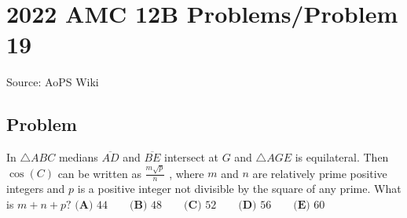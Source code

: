 \documentclass[12pt]{article}
\begin{document}
\section*{{2022 AMC 12B Problems/Problem 19}}
Source: AoPS Wiki

\subsection*{Problem}
In $\triangle{ABC}$ medians $\overline{AD}$ and $\overline{BE}$ intersect at $G$ and $\triangle{AGE}$ is equilateral. Then $\cos(C)$ can be written as $\frac{m\sqrt p}n$ , where $m$ and $n$ are relatively prime positive integers and $p$ is a positive integer not divisible by the square of any prime. What is $m+n+p?$ $\textbf{(A) }44 \qquad \textbf{(B) }48 \qquad \textbf{(C) }52 \qquad \textbf{(D) }56 \qquad \textbf{(E) }60$
\end{document}
